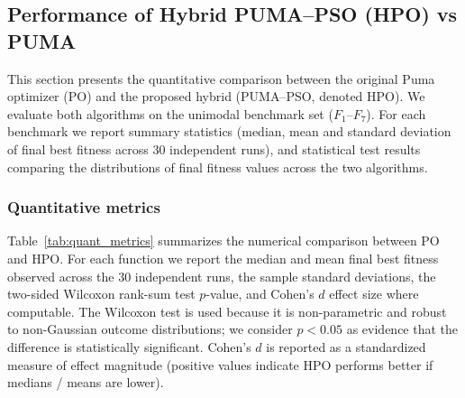 \documentclass[a4paper,12pt]{article}
\begin{document}
\subsection{Performance of Hybrid PUMA--PSO (HPO) vs PUMA}
\FloatBarrier 
\label{sec:performance_hpo_vs_po}

This section presents the quantitative comparison between the original Puma optimizer (PO) and the proposed hybrid (PUMA--PSO, denoted HPO). We evaluate both algorithms on the unimodal benchmark set ($F_1$--$F_7$). For each benchmark we report summary statistics (median, mean and standard deviation of final best fitness across 30 independent runs), and statistical test results comparing the distributions of final fitness values across the two algorithms.

\subsubsection{Quantitative metrics}
\label{sec:quant_metrics}

Table~\ref{tab:quant_metrics} summarizes the numerical comparison between PO and HPO. For each function we report the median and mean final best fitness observed across the 30 independent runs, the sample standard deviations, the two-sided Wilcoxon rank-sum test \(p\)-value, and Cohen's \(d\) effect size where computable. The Wilcoxon test is used because it is non-parametric and robust to non-Gaussian outcome distributions; we consider \(p<0.05\) as evidence that the difference is statistically significant. Cohen's \(d\) is reported as a standardized measure of effect magnitude (positive values indicate HPO performs better if medians / means are lower).
\end{document}

